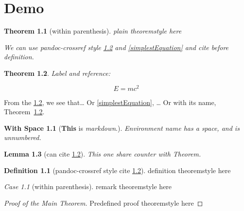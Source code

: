 \usepackage{amsthm}
\theoremstyle{plain}
\newtheorem{Theorem}{Theorem}[section]
\newtheorem{Lemma}[Theorem]{Lemma}
\newtheorem{Corollary}[Theorem]{Corollary}
\newtheorem*{With Space}{With Space}
\newtheorem{Proposition}{Proposition}[section]
\newtheorem{Conjecture}[Proposition]{Conjecture}
\newtheorem{WithoutSpace}{WithoutSpace}[section]
\newtheorem{KL}{Klein’s Lemma}[section]
\theoremstyle{definition}
\newtheorem{Definition}{Definition}[section]
\theoremstyle{remark}
\newtheorem{Case}{Case}[section]
\chapter{Demo}\label{demo}

\begin{Theorem}[within parenthesis]
plain theoremstyle \emph{here}

We can use pandoc-crossref style \ref{simplestEquation} and
\eqref{simplestEquation} and cite before definition.
\end{Theorem}

\begin{Theorem}\label{simplestEquation}
Label and reference:

\[E=mc^2\]
\end{Theorem}

From the \ref{simplestEquation}, we see that\ldots{} Or
\eqref{simplestEquation}, \ldots{} Or with its name,
Theorem~\ref{simplestEquation}.

\begin{With Space}[\textbf{This} is \emph{markdown}.]
Environment name has a space, and is unnumbered.
\end{With Space}

\begin{Lemma}[{can cite \ref{simplestEquation}}]
This one share counter with Theorem.
\end{Lemma}

\begin{Definition}[{pandoc-crossref style cite \ref{simplestEquation}}]
definition theoremstyle here
\end{Definition}

\begin{Case}[within parenthesis]
remark theoremstyle here
\end{Case}

\begin{proof}[Proof of the Main Theorem]
Predefined proof theoremstyle here
\end{proof}

